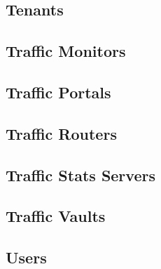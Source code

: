 \subsection{Tenants}



\subsection{Traffic Monitors}



\subsection{Traffic Portals}



\subsection{Traffic Routers}



\subsection{Traffic Stats Servers}



\subsection{Traffic Vaults}



\subsection{Users\label{sec:users}}
